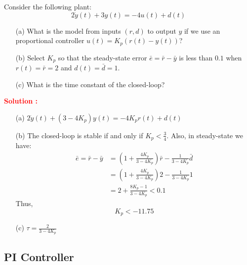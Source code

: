 \documentclass[12pt]{article}
\begin{document}
Consider the following plant:
\begin{equation}
    2\dot{y}(t) + 3 y(t) = -4 u(t) + d(t)
\end{equation}
\begin{itemize}
    \item[(a)] What is the model from inputs \((r,d)\) to output \(y\) if we use an proportional controller \(u(t) = K_p (r(t)-y(t))\)?
    \item[(b)] Select \(K_p\) so that the steady-state error \(\bar{e} = \bar{r} - \bar{y}\) is less than \(0.1\) when \(r(t) = \bar{r} = 2\) and \(d(t) = \bar{d} = 1\).
    \item[(c)] What is the time constant of the closed-loop?
\end{itemize}
\textbf{\textcolor{red}{Solution :}} 
\begin{itemize}
    \item[(a)] $ 2 \dot{y}(t) + (3-4 K_p) y(t) = -4 K_p r(t) + d(t)$
    \item[(b)] The closed-loop is stable if and only if \(K_p < \frac{3}{4}\). Also, in steady-state we have:
    \begin{align}
        \bar{e} = \bar{r} - \bar{y} &= \left(1+\frac{4 K_p}{3-4K_p} \right)\bar{r} - \frac{1}{3-4K_p} \bar{d} \\ &= \left(1+\frac{4 K_p}{3-4K_p} \right)2 - \frac{1}{3-4K_p} 1 \\
        & = 2 + \frac{8K_p-1}{3-4K_p} < 0.1
    \end{align}
    Thus,
    \begin{equation}
        K_p < -11.75
    \end{equation}
    \item[(c)] \(\tau = \frac{2}{3-4K_p}\)
\end{itemize}

\clearpage
\subsection{PI Controller}
\end{document}
